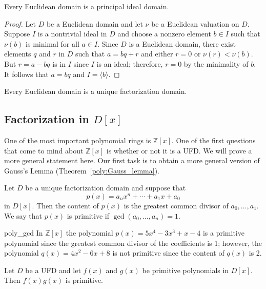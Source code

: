 \begin{theorem}
Every Euclidean domain is a principal ideal domain.
\end{theorem}
 
\begin{proof}
Let $D$ be a Euclidean domain and let $\nu$ be a Euclidean valuation
on $D$.  Suppose $I$ is a nontrivial ideal in $D$ and choose a nonzero
element $b \in I$ such that $\nu(b)$ is minimal for all $a \in I$. 
Since $D$ is a Euclidean domain, there exist elements $q$ and $r$ in
$D$ such that $a = bq +r$ and either $r=0$ or $\nu(r) < \nu(b)$. But
$r = a - bq$ is in $I$ since $I$ is an ideal; therefore, $r = 0$ by the
minimality of $b$. It follows that $a = bq$ and $I = \langle b
\rangle$. 
\end{proof}
 

\begin{corollary}
Every Euclidean domain is a unique factorization domain.
\end{corollary}


\subsection*{Factorization in $D[x]$}

One of the most important polynomial rings is ${\mathbb Z}[x]$.  One of the first questions that come to mind about ${\mathbb Z}[x]$ is whether or not it is a UFD.  We will prove a more general statement here.  Our first task is to obtain a more general version of Gauss's Lemma
(Theorem~\ref{poly:Gauss_lemma}).  

Let $D$ be a unique factorization domain and suppose that 
\[
p(x) = a_n x^n + \cdots + a_1 x + a_0
\]
in $D[x]$.  Then the {\bfi content\/} of $p(x)$ is the greatest common divisor of $a_0, \ldots, a_1$.  We say
that $p(x)$ is {\bfi primitive\/} if $\gcd(a_0, \ldots, a_n ) = 1$.    
 
\begin{example}{poly_gcd}
In ${\mathbb Z}[x]$ the polynomial $p(x)= 5 x^4 - 3 x^3 + x -4$ is a primitive polynomial since the greatest common divisor of the
coefficients is 1; however, the polynomial $q(x) = 4 x^2 - 6 x + 8$ is not primitive since the content of $q(x)$ is 2.
\end{example}
 
\begin{theorem}\label{domains:Gauss_lemma}
Let $D$ be a UFD and let $f(x)$ and $g(x)$ be primitive polynomials in $D[x]$.  Then $f(x) g(x)$ is primitive.
\end{theorem}
 
